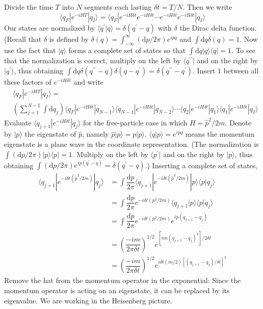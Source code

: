 \documentclass[11pt,a4paper]{article}
\newcommand{\dif}{\mathrm{d}}
\begin{document}
Divide the time $T$ into $N$ segments each lasting $\delta t=T/N$. Then we write
\begin{equation}
\langle q_F |e^{-iHT}| q_I\rangle = \langle q_F |e^{-iH\delta t} e^{-iH\delta t} \cdots e^{-iH\delta t}e^{-iH\delta t}| q_I\rangle
\end{equation}
Our states are normalized by $\langle q^\prime |q\rangle = \delta(q^\prime - q)$ with $\delta$ the Dirac delta function. (Recall that $\delta$ is defined by $\delta(q) = \int_{-\infty}^\infty (\dif p/2\pi) e^{ipq}$ and $\int \dif q \delta(q) = 1$. Now use the fact that $|q\rangle$ forms a complete set of states so that $\int \dif q |q\rangle \langle q| = 1$. To see that the normalization is correct, multiply on the left by $\langle q^{\prime \prime} |$ and on the right by $|q^\prime \rangle$, thus obtaining $\int \dif q \delta(q^{\prime \prime} - q) \delta(q - q^\prime) = \delta(q^{\prime \prime} - q^{\prime})$. Insert $1$ between all these factors of $e^{-i H \delta t}$ and write
\begin{align}
\nonumber & \langle q_F |e^{-iHT}| q_I\rangle =  \\
& \left(\sum_{j=1}^{N-1}  \int \dif q_j \right) \langle q_F |e^{-iH\delta t} |q_{N-1}\rangle \langle q_{N-1} |e^{-iH\delta t} |q_{N-2}\rangle \cdots \langle q_2 |e^{-iH\delta t} |q_1\rangle \langle q_1 |e^{-iH\delta t} |q_{I}\rangle
\end{align}
Evaluate $\langle q_{j+1} |e^{-iH\delta t} |q_j\rangle$ for the free-particle case in which $H = \hat{p}^2/2m$. Denote by $ |p\rangle$ the eigenstate of $\hat{p}$, namely $\hat{p}  |p\rangle = p  |p\rangle$. $\langle q |p\rangle = e^{ipq}$ means the momentum eigenstate is a plane wave in the coordinate representation.  (The normalization is $\int (\dif p/2\pi) |p\rangle \langle p| =1$. Multiply on the left by $\langle p^\prime|$ and on the right by $|p\rangle$, thus obtaining $\int (\dif p/2\pi) e^{ip(q^\prime -q)} = \delta(q^\prime -q)$.) Inserting a complete set of states,
\begin{align*}
\langle q_{j+1} |e^{-i\delta t(\hat{p}^2/2m)} |q_j\rangle &= \int \dfrac{\dif p}{2\pi } \langle q_{j+1} |e^{-i\delta t(\hat{p}^2/2m)} |p\rangle \langle p |q_j\rangle \\
&= \int \dfrac{\dif p}{2\pi } e^{-i\delta t(p^2/2m)} \langle q_{j+1} |p\rangle \langle p |q_j\rangle \\
&= \int \dfrac{\dif p}{2\pi } e^{-i\delta t(p^2/2m)} e^{ip(q_{j+1} -q_j)} \\
&= \left(\dfrac{-i m}{2\pi \delta t} \right)^{1/2} e^{[im(q_{j+1}-q_{j})^2]/2\delta t} \\
&= \left(\dfrac{-i m}{2\pi \delta t} \right)^{1/2} e^{i\delta t(m/2)[(q_{j+1}-q_{j})/\delta t]^2}
\end{align*}
Remove the hat from the momentum operator in the exponential: Since the momentum operator is acting on an eigenstate, it can be replaced by its eigenvalue. We are working in the Heisenberg picture.
\end{document}
